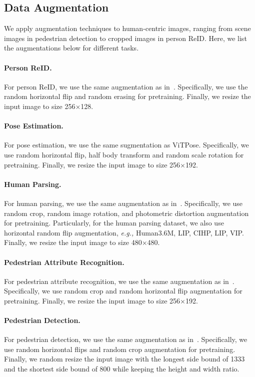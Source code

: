 \documentclass[10pt,twocolumn,letterpaper]{article}
\begin{document}
\subsection{Data Augmentation}
We apply augmentation techniques to human-centric images, ranging from scene images in pedestrian detection to cropped images in person ReID. Here, we list the augmentations below for different tasks.

\paragraph{Person ReID.} For person ReID, we use the same augmentation as in~\cite{luo2019bag}. Specifically, we use the random horizontal flip and random erasing for pretraining. Finally, we resize the input image to size 256$\times$128.

\paragraph{Pose Estimation.} 
For pose estimation, we use the same sugmentation as ViTPose\cite{xu2022vitpose}. Specifically, we use random horizontal flip, half body transform and random scale rotation for pretraining. Finally, we resize the input image to size 256$\times$192.

\paragraph{Human Parsing.}
For human parsing, we use the same augmentation as in~\cite{gong2018instance}. Specifically, we use random crop, random image rotation, and photometric distortion augmentation for pretraining. Particularly, for the human parsing dataset, we also use horizontal random flip augmentation, \emph{e.g.,} Human3.6M, LIP, CIHP, LIP, VIP. Finally, we resize the input image to size 480$\times$480.

\paragraph{Pedestrian Attribute Recognition.}
For pedestrian attribute recognition, we use the same augmentation as in~\cite{li2022label2label}. Specifically, we use random crop and random horizontal flip augmentation for pretraining. Finally, we resize the input image to size 256$\times$192.

\paragraph{Pedestrian Detection.}
For pedestrian detection, we use the same augmentation as in~\cite{zheng2022progressive}. Specifically, we use random horizontal flips and random crop augmentation for pretraining. Finally, we random resize the input image with the longest side bound of 1333 and the shortest side bound of 800 while keeping the height and width ratio.
\end{document}

